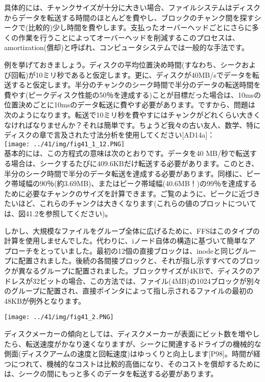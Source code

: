 具体的には、チャンクサイズが十分に大きい場合、ファイルシステムはディスクからデータを転送する時間のほとんどを費やし、ブロックのチャンク間を探すシークで(比較的)少し時間を費やします。支払ったオーバーヘッドごとにさらに多くの作業を行うことによってオーバーヘッドを削減するこのプロセスは、amortization(償却)と呼ばれ、コンピュータシステムでは一般的な手法です。

例を挙げておきましょう。ディスクの平均位置決め時間(すなわち、シークおよび回転)が10ミリ秒であると仮定します。更に、ディスクが40MB/sでデータを転送すると仮定します。半分のチャンクのシーク時間で半分のデータの転送時間を費やす(ピークディスク性能の50％を達成する)ことが目標だった場合は、10msの位置決めごとに10msのデータ転送に費やす必要があります。ですから、問題は次のようになります。転送で10ミリ秒を費やすにはチャンクがどれくらい大きくなければなりませんか？それは簡単です。ちょうど我々の古い友人、数学、特にディスクの章で言及された寸法分析を使用してください{[}AD14a{]}：\\
\texttt{[image: ../41/img/fig41\_1\_12.PNG]}\\
基本的には、この方程式の意味は次のとおりです。データを40
MB/秒で転送する場合は、シークするたびに409.6KBだけ転送する必要があります。このとき、半分のシーク時間で半分のデータ転送を達成する必要があります。同様に、ピーク帯域幅の90％(約3.69MB)、またはピーク帯域幅(40.6MB！)の99％を達成するために必要なチャンクのサイズを計算できます。ご覧のように、ピークに近づきたいほど、これらのチャンクは大きくなります(これらの値のプロットについては、図41.2を参照してください)。

しかし、大規模なファイルをグループ全体に広げるために、FFSはこのタイプの計算を使用しませんでした。代わりに、iノード自体の構造に基づいて簡単なアプローチをとっていました。最初の12個の直接ブロックは、inodeと同じグループに配置されました。後続の各間接ブロックと、それが指し示すすべてのブロックが異なるグループに配置されました。ブロックサイズが4KBで、ディスクのアドレスが32ビットの場合、この方法では、ファイル(4MB)の1024ブロックが別々のグループに配置され、直接ポインタによって指し示されるファイルの最初の48KBが例外となります。

\texttt{[image: ../41/img/fig41\_2.PNG]}

ディスクメーカーの傾向としては、ディスクメーカーが表面にビット数を増やしたら、転送速度がかなり速くなりますが、シークに関連するドライブの機械的な側面(ディスクアームの速度と回転速度)はゆっくりと向上します{[}P98{]}。時間が経つにつれて、機械的なコストは比較的高価になり、そのコストを償却するためには、シークの間にもっと多くのデータを転送する必要があります。

